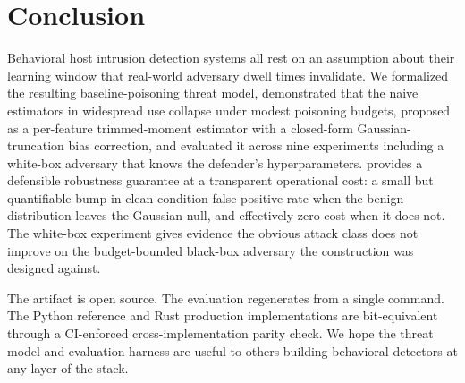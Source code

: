 \section{Conclusion}
\label{sec:conclusion}

Behavioral host intrusion detection systems all rest on an
assumption about their learning window that real-world adversary
dwell times invalidate. We formalized the resulting baseline-poisoning
threat model, demonstrated that the naive estimators in widespread
use collapse under modest poisoning budgets, proposed \sediment{} as
a per-feature trimmed-moment estimator with a closed-form
Gaussian-truncation bias correction, and evaluated it across nine
experiments including a white-box adversary that knows the
defender's hyperparameters. \sediment{} provides a defensible
robustness guarantee at a transparent operational cost: a small but
quantifiable bump in clean-condition false-positive rate when the
benign distribution leaves the Gaussian null, and effectively zero
cost when it does not. The white-box experiment gives evidence the
obvious attack class does not improve on the budget-bounded
black-box adversary the construction was designed against.

The artifact is open source. The evaluation regenerates from a
single command. The Python reference and Rust production
implementations are bit-equivalent through a CI-enforced
cross-implementation parity check. We hope the threat model and
evaluation harness are useful to others building behavioral
detectors at any layer of the stack.
